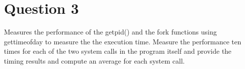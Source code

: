 \documentclass[main.tex]{subfiles}
\begin{document}
\section{Question 3}

Measures the performance of the getpid()  and the fork functions using
gettimeofday to measure the the execution time. Measure the performance ten
times for each of the two system calls in the program itself and provide the
timing results and compute an average for each system call.



\end{document}
